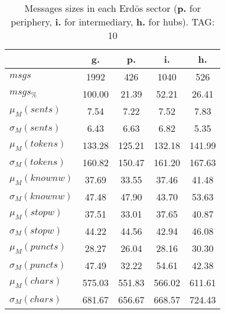 \begin{table}[h!]
\begin{center}
\begin{tabular}{| l | c | c | c | c |}\hline
 & g. & p. & i. & h. \\\hline
$msgs$ & 1992  & 426  & 1040  & 526 \\\hline
$msgs_{\%}$ & 100.00  & 21.39  & 52.21  & 26.41 \\\hline
$\mu_M(sents)$ & 7.54  & 7.22  & 7.52  & 7.83 \\\hline
$\sigma_M(sents)$ & 6.43  & 6.63  & 6.82  & 5.35 \\\hline
$\mu_M(tokens)$ & 133.28  & 125.21  & 132.18  & 141.99 \\\hline
$\sigma_M(tokens)$ & 160.82  & 150.47  & 161.20  & 167.63 \\\hline
$\mu_M(knownw)$ & 37.69  & 33.55  & 37.46  & 41.48 \\\hline
$\sigma_M(knownw)$ & 47.48  & 47.90  & 43.70  & 53.63 \\\hline
$\mu_M(stopw)$ & 37.51  & 33.01  & 37.65  & 40.87 \\\hline
$\sigma_M(stopw)$ & 44.22  & 44.56  & 42.94  & 46.08 \\\hline
$\mu_M(puncts)$ & 28.27  & 26.04  & 28.16  & 30.30 \\\hline
$\sigma_M(puncts)$ & 47.49  & 32.22  & 54.61  & 42.38 \\\hline
$\mu_M(chars)$ & 575.03  & 551.83  & 566.02  & 611.61 \\\hline
$\sigma_M(chars)$ & 681.67  & 656.67  & 668.57  & 724.43 \\\hline
\end{tabular}
\caption{Messages sizes in each Erd\"os sector ({{\bf p.}} for periphery, {{\bf i.}} for intermediary, {{\bf h.}} for hubs). TAG: 10}
\end{center}
\end{table}